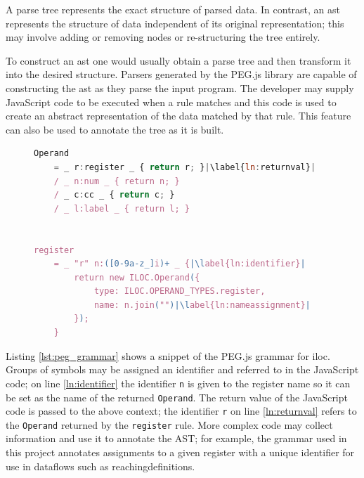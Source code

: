\documentclass[bsc,twoside,singlespacing,parskip,logo,notimes,normalheadings]{infthesis}
\begin{document}
        A parse tree represents the exact structure of parsed data. In
        contrast, an \gls{ast} represents the structure of data
        independent of its original representation; this may involve
        adding or removing nodes or re-structuring the tree entirely.

        To construct an \gls{ast} one would usually obtain a parse
        tree and then transform it into the desired structure. Parsers
        generated by the PEG.js library are capable of constructing
        the \gls{ast} as they parse the input program. The developer
        may supply JavaScript code to be executed when a rule matches
        and this code is used to create an abstract representation of
        the data matched by that rule. This feature can also be used
        to annotate the tree as it is built.

        \begin{figure}[!ht]
          \begin{lstlisting}[language=JavaScript, caption=Example of PEG.js Grammar Rules, escapeinside={||}, label=lst:peg_grammar]
Operand
    = _ r:register _ { return r; }|\label{ln:returnval}|
    / _ n:num _ { return n; }      
    / _ c:cc _ { return c; }       
    / _ l:label _ { return l; }    
                                   

register
    = _ "r" n:([0-9a-z_]i)+ _ {|\label{ln:identifier}|
        return new ILOC.Operand({
            type: ILOC.OPERAND_TYPES.register,
            name: n.join("")|\label{ln:nameassignment}|
        });
    }
          \end{lstlisting}
        \end{figure}

        Listing \ref{lst:peg_grammar} shows a snippet of the PEG.js
        grammar for \gls{iloc}. Groups of symbols may be assigned an
        identifier and referred to in the JavaScript code; on line
        \ref{ln:identifier} the identifier {\tt n} is given to the
        register name so it can be set as the name of the returned
        {\tt Operand}. The return value of the JavaScript code is
        passed to the above context; the identifier {\tt r} on line
        \ref{ln:returnval} refers to the {\tt Operand} returned by the
        {\tt register} rule. More complex code may collect information
        and use it to annotate the AST; for example, the grammar used
        in this project annotates assignments to a given register with
        a unique identifier for use in \gls{dataflow}s such as
        \gls{reachingdefinition}s.
\end{document}

